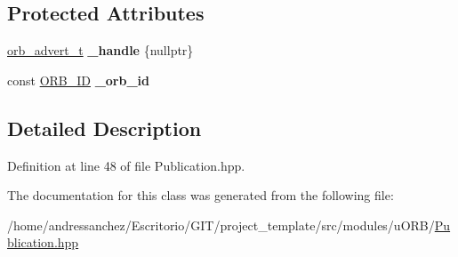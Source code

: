 \subsection*{Protected Attributes}
\begin{DoxyCompactItemize}
\item 
\mbox{\label{classuORB_1_1PublicationBase_a4254d929704949ce6ef55e1b9a9d3037}} 
\hyperlink{uORB_8h_a8d0cfa5f9ea6427a37057d6cea6dd990}{orb\+\_\+advert\+\_\+t} {\bfseries \+\_\+handle} \{nullptr\}
\item 
\mbox{\label{classuORB_1_1PublicationBase_a72f822f0ac8d4853c15c71de9d27f03a}} 
const \hyperlink{uORB_8h_a96af5434ec1acdf24287bd7851b0413f}{O\+R\+B\+\_\+\+ID} {\bfseries \+\_\+orb\+\_\+id}
\end{DoxyCompactItemize}


\subsection{Detailed Description}


Definition at line 48 of file Publication.\+hpp.



The documentation for this class was generated from the following file\+:\begin{DoxyCompactItemize}
\item 
/home/andressanchez/\+Escritorio/\+G\+I\+T/project\+\_\+template/src/modules/u\+O\+R\+B/\hyperlink{Publication_8hpp}{Publication.\+hpp}\end{DoxyCompactItemize}
